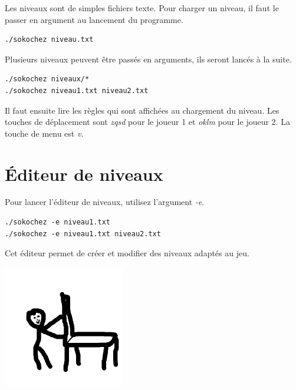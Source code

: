 \documentclass{article}
\begin{document}
Les niveaux sont de simples fichiers texte. 
Pour charger un niveau, il faut le passer en argument au lancement du programme.
\begin{lstlisting}
./sokochez niveau.txt
\end{lstlisting}
Plusieurs niveaux peuvent être passés en arguments, ils seront lancés à la suite.
\begin{lstlisting}
./sokochez niveaux/*
./sokochez niveau1.txt niveau2.txt
\end{lstlisting}
Il faut ensuite lire les règles qui sont affichées au chargement du niveau.
Les touches de déplacement sont \emph{zqsd} pour le joueur 1 et \emph{oklm} pour le joueur 2.
La touche de menu est \emph{v}.

\section{Éditeur de niveaux}
Pour lancer l'éditeur de niveaux, utilisez l'argument \emph{-e}.
\begin{lstlisting}
./sokochez -e niveau1.txt
./sokochez -e niveau1.txt niveau2.txt
\end{lstlisting}
Cet éditeur permet de créer et modifier des niveaux adaptés au jeu.

\begin{center}
    \includegraphics[width=200px,height=200px]{logo.png}
\end{center}
\end{document}
